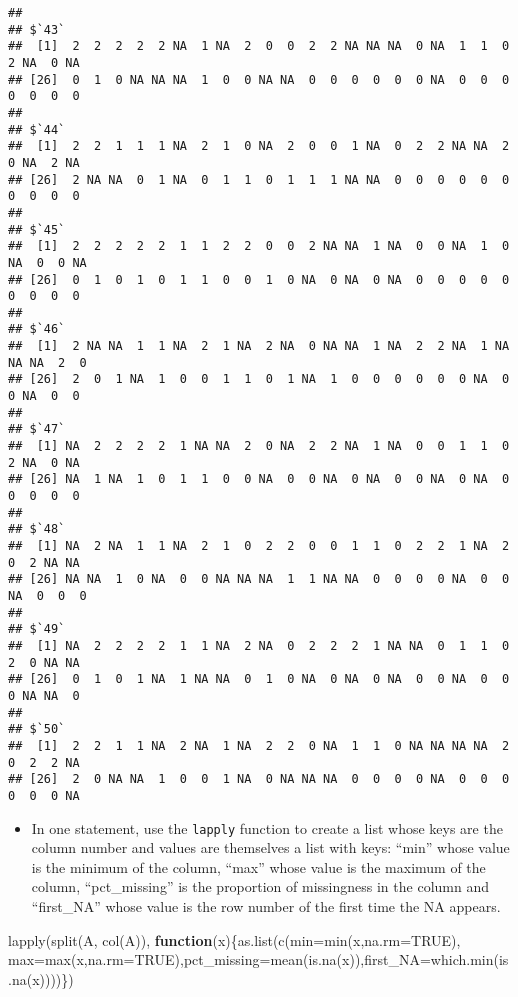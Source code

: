 \documentclass[
]{article}
\newenvironment{Shaded}{\begin{snugshade}}{\end{snugshade}}
\newcommand{\AttributeTok}[1]{\textcolor[rgb]{0.77,0.63,0.00}{#1}}
\newcommand{\ConstantTok}[1]{\textcolor[rgb]{0.00,0.00,0.00}{#1}}
\newcommand{\ControlFlowTok}[1]{\textcolor[rgb]{0.13,0.29,0.53}{\textbf{#1}}}
\newcommand{\FunctionTok}[1]{\textcolor[rgb]{0.00,0.00,0.00}{#1}}
\newcommand{\NormalTok}[1]{#1}
\providecommand{\tightlist}{%
  \setlength{\itemsep}{0pt}\setlength{\parskip}{0pt}}
\begin{document}
\begin{verbatim}
## 
## $`43`
##  [1]  2  2  2  2  2 NA  1 NA  2  0  0  2  2 NA NA NA  0 NA  1  1  0  2 NA  0 NA
## [26]  0  1  0 NA NA NA  1  0  0 NA NA  0  0  0  0  0  0 NA  0  0  0  0  0  0  0
## 
## $`44`
##  [1]  2  2  1  1  1 NA  2  1  0 NA  2  0  0  1 NA  0  2  2 NA NA  2  0 NA  2 NA
## [26]  2 NA NA  0  1 NA  0  1  1  0  1  1  1 NA NA  0  0  0  0  0  0  0  0  0  0
## 
## $`45`
##  [1]  2  2  2  2  2  1  1  2  2  0  0  2 NA NA  1 NA  0  0 NA  1  0 NA  0  0 NA
## [26]  0  1  0  1  0  1  1  0  0  1  0 NA  0 NA  0 NA  0  0  0  0  0  0  0  0  0
## 
## $`46`
##  [1]  2 NA NA  1  1 NA  2  1 NA  2 NA  0 NA NA  1 NA  2  2 NA  1 NA NA NA  2  0
## [26]  2  0  1 NA  1  0  0  1  1  0  1 NA  1  0  0  0  0  0  0 NA  0  0 NA  0  0
## 
## $`47`
##  [1] NA  2  2  2  2  1 NA NA  2  0 NA  2  2 NA  1 NA  0  0  1  1  0  2 NA  0 NA
## [26] NA  1 NA  1  0  1  1  0  0 NA  0  0 NA  0 NA  0  0 NA  0 NA  0  0  0  0  0
## 
## $`48`
##  [1] NA  2 NA  1  1 NA  2  1  0  2  2  0  0  1  1  0  2  2  1 NA  2  0  2 NA NA
## [26] NA NA  1  0 NA  0  0 NA NA NA  1  1 NA NA  0  0  0  0 NA  0  0 NA  0  0  0
## 
## $`49`
##  [1] NA  2  2  2  2  1  1 NA  2 NA  0  2  2  2  1 NA NA  0  1  1  0  2  0 NA NA
## [26]  0  1  0  1 NA  1 NA NA  0  1  0 NA  0 NA  0 NA  0  0 NA  0  0  0 NA NA  0
## 
## $`50`
##  [1]  2  2  1  1 NA  2 NA  1 NA  2  2  0 NA  1  1  0 NA NA NA NA  2  0  2  2 NA
## [26]  2  0 NA NA  1  0  0  1 NA  0 NA NA NA  0  0  0  0 NA  0  0  0  0  0  0 NA
\end{verbatim}

\begin{itemize}
\tightlist
\item
  In one statement, use the \texttt{lapply} function to create a list
  whose keys are the column number and values are themselves a list with
  keys: ``min'' whose value is the minimum of the column, ``max'' whose
  value is the maximum of the column, ``pct\_missing'' is the proportion
  of missingness in the column and ``first\_NA'' whose value is the row
  number of the first time the NA appears.
\end{itemize}

\begin{Shaded}
\begin{Highlighting}[]
\FunctionTok{lapply}\NormalTok{(}\FunctionTok{split}\NormalTok{(A, }\FunctionTok{col}\NormalTok{(A)), }\ControlFlowTok{function}\NormalTok{(x)\{}\FunctionTok{as.list}\NormalTok{(}\FunctionTok{c}\NormalTok{(}\AttributeTok{min=}\FunctionTok{min}\NormalTok{(x,}\AttributeTok{na.rm=}\ConstantTok{TRUE}\NormalTok{), }\AttributeTok{max=}\FunctionTok{max}\NormalTok{(x,}\AttributeTok{na.rm=}\ConstantTok{TRUE}\NormalTok{),}\AttributeTok{pct\_missing=}\FunctionTok{mean}\NormalTok{(}\FunctionTok{is.na}\NormalTok{(x)),}\AttributeTok{first\_NA=}\FunctionTok{which.min}\NormalTok{(}\FunctionTok{is.na}\NormalTok{(x))))\})}
\end{Highlighting}
\end{Shaded}
\end{document}
